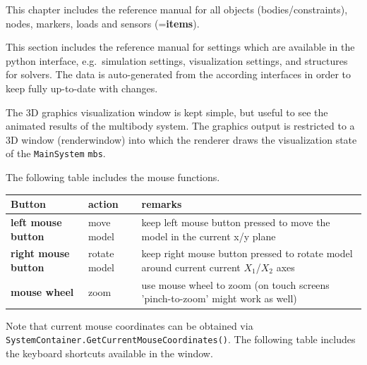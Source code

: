 \documentclass[11pt,a4paper]{book}
\begin{document}
 \label{sec:theory}


 \label{sec:item:reference:manual}
This chapter includes the reference manual for all objects (bodies/constraints), nodes, markers, loads and sensors ({=\bf items}).



This section includes the reference manual for settings which are available in the python interface, e.g.\ simulation settings, visualization settings, and structures for solvers. The data is auto-generated from the according interfaces in order to keep fully 
up-to-date with changes.




The 3D graphics visualization window is kept simple, but useful to see the animated results of the multibody system.
The graphics output is restricted to a 3D window (renderwindow) into which the renderer draws the visualization state of the \texttt{MainSystem} \texttt{mbs}.

The following table includes the mouse functions. 

\begin{center}
  \footnotesize
  \begin{longtable}{| p{4cm} | p{4cm} | p{8cm} |} 
	\hline
  \bf Button & action & \bf remarks \\ \hline
  \bf left mouse button & move model & keep left mouse button pressed to move the model in the current x/y plane\\ \hline
  \bf right mouse button & rotate model & keep right mouse button pressed to rotate model around current current $X_1$/$X_2$ axes\\ \hline
  \bf mouse wheel & zoom & use mouse wheel to zoom (on touch screens 'pinch-to-zoom' might work as well) \\ \hline
  \end{longtable}
\end{center}
Note that current mouse coordinates can be obtained via 
\texttt{SystemContainer.GetCurrentMouseCoordinates()}.
The following table includes the keyboard shortcuts available in the window. 
\end{document}
